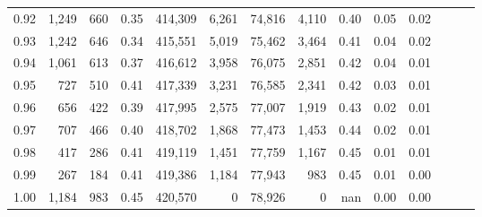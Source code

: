 \begin{tabular}{rrrrrrrrrrrrrr}
0.92 &  1,249 &    660 &  0.35 &  414,309 &    6,261 &  74,816 &   4,110 &  0.40 &  0.05 &      0.02 \\
0.93 &  1,242 &    646 &  0.34 &  415,551 &    5,019 &  75,462 &   3,464 &  0.41 &  0.04 &      0.02 \\
0.94 &  1,061 &    613 &  0.37 &  416,612 &    3,958 &  76,075 &   2,851 &  0.42 &  0.04 &      0.01 \\
0.95 &    727 &    510 &  0.41 &  417,339 &    3,231 &  76,585 &   2,341 &  0.42 &  0.03 &      0.01 \\
0.96 &    656 &    422 &  0.39 &  417,995 &    2,575 &  77,007 &   1,919 &  0.43 &  0.02 &      0.01 \\
0.97 &    707 &    466 &  0.40 &  418,702 &    1,868 &  77,473 &   1,453 &  0.44 &  0.02 &      0.01 \\
0.98 &    417 &    286 &  0.41 &  419,119 &    1,451 &  77,759 &   1,167 &  0.45 &  0.01 &      0.01 \\
0.99 &    267 &    184 &  0.41 &  419,386 &    1,184 &  77,943 &     983 &  0.45 &  0.01 &      0.00 \\
1.00 &  1,184 &    983 &  0.45 &  420,570 &        0 &  78,926 &       0 &   nan &  0.00 &      0.00 \\
\bottomrule
\end{tabular}
